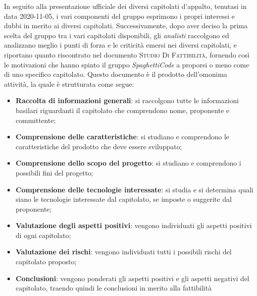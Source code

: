 In seguito alla presentazione ufficiale dei diversi capitolati d'appalto, tenutasi in data 2020-11-05, i vari componenti
del gruppo esprimono i propri interessi e dubbi in merito ai diversi capitolati.
Successivamente, dopo aver deciso la prima scelta del gruppo tra i vari capitolati disponibili, gli \emph{analisti}
raccolgono ed analizzano meglio i punti di forza e le criticità emersi nei diversi capitolati, e riportano quanto
riscontrato nel documento \textsc{Studio Di Fattibilità}, fornendo così le motivazioni che hanno spinto il gruppo
\emph{SpaghettiCode} a proporsi o meno come  di uno specifico capitolato. Questo documento è il
prodotto dell'omonima attività, la quale è strutturata come segue:
\begin{itemize}
    \item \textbf{Raccolta di informazioni generali}: si raccolgono tutte le informazioni basilari riguardanti il
    capitolato che comprendono nome, proponente e committente;
    \item \textbf{Comprensione delle caratteristiche}: si studiano e comprendono le caratteristiche del prodotto che
    deve essere sviluppato;
    \item \textbf{Comprensione dello scopo del progetto}: si studiano e comprendono i possibili fini del progetto;
    \item \textbf{Comprensione delle tecnologie interessate}: si studia e si determina quali siano le tecnologie
    interessate dal capitolato, se imposte o suggerite dal proponente;
    \item \textbf{Valutazione degli aspetti positivi}: vengono individuati gli aspetti positivi di ogni capitolato;
    \item \textbf{Valutazione dei rischi}: vengono individuati tutti i possibili rischi del capitolato proposto;
    \item \textbf{Conclusioni}: vengono ponderati gli aspetti positivi e gli aspetti negativi del capitolato, traendo
    quindi le conclusioni in merito alla fattibilità
\end{itemize}

